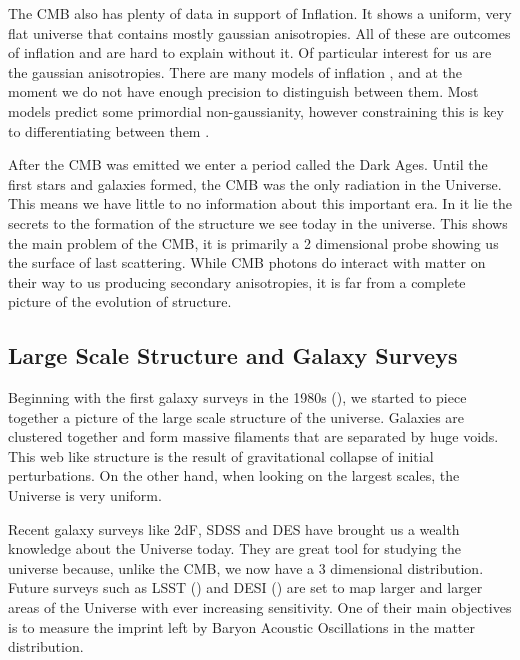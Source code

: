 The CMB also has plenty of data in support of Inflation. It shows a uniform, very flat universe that contains mostly gaussian anisotropies. All of these are outcomes of inflation and are hard to explain without it. Of particular interest for us are the gaussian anisotropies. There are many models of inflation , and at the moment we do not have enough precision to distinguish between them. Most models predict some primordial non-gaussianity, however constraining this is key to differentiating between them .

After the CMB was emitted we enter a period called the Dark Ages. Until the first stars and galaxies formed, the CMB was the only radiation in the Universe. This means we have little to no information about this important era. In it lie the secrets to the formation of the structure we see today in the universe. This shows the main problem of the CMB, it is primarily a 2 dimensional probe showing us the surface of last scattering. While CMB photons do interact with matter on their way to us producing secondary anisotropies, it is far from a complete picture of the evolution of structure.

\subsection{Large Scale Structure and Galaxy Surveys}

Beginning with the first galaxy surveys in the 1980s (\cite{Davis_galaxy_survey}), we started to piece together a picture of the large scale structure of the universe. Galaxies are clustered together and form massive filaments that are separated by huge voids. This web like structure is the result of gravitational collapse of initial perturbations. On the other hand, when looking on the largest scales, the Universe is very uniform.

Recent galaxy surveys like 2dF, SDSS and DES  have brought us a wealth knowledge about the Universe today. They are great tool for studying the universe because, unlike the CMB, we now have a 3 dimensional distribution. Future surveys such as LSST (\cite{2009arXiv0912.0201L}) and DESI (\cite{2013arXiv1308.0847L}) are set to map larger and larger areas of the Universe with ever increasing sensitivity. One of their main objectives is to measure the imprint left by Baryon Acoustic Oscillations in the matter distribution. 

